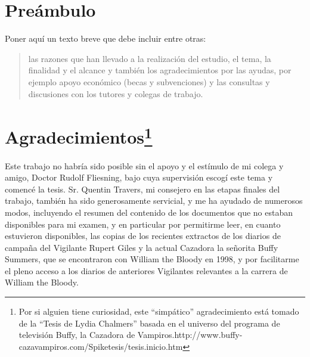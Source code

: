 

\chapter*{Preámbulo}
\thispagestyle{empty}
Poner aquí un texto breve que debe incluir entre otras:
\begin{quote}
	las razones que han llevado a la realización del estudio, el tema, la finalidad y el alcance y también los agradecimientos por las ayudas, por ejemplo apoyo económico (becas y subvenciones) y las consultas y discusiones con los tutores y colegas de trabajo. \citep{UNE50136:97}
\end{quote}


\cleardoublepage %

\chapter*{Agradecimientos\footnote{Por si alguien tiene curiosidad, este ``simpático'' agradecimiento está tomado de la ``Tesis de Lydia Chalmers'' basada en el universo del programa de televisión Buffy, la Cazadora de Vampiros.http://www.buffy-cazavampiros.com/Spiketesis/tesis.inicio.htm}
}

\thispagestyle{empty}
\vspace{1cm}

Este trabajo no habría sido posible sin el apoyo y el estímulo de mi colega y amigo, Doctor Rudolf Fliesning,  bajo cuya supervisión escogí este tema y comencé la tesis. Sr. Quentin Travers, mi consejero en las etapas finales del trabajo, también ha sido generosamente servicial, y me ha ayudado de numerosos modos, incluyendo el resumen del contenido de los documentos que no estaban disponibles para mi examen, y en particular por permitirme leer, en cuanto estuvieron  disponibles, las copias de los  recientes extractos de los diarios de campaña del Vigilante Rupert Giles y la actual Cazadora la señorita Buffy Summers, que se encontraron con William the Bloody en 1998, y por facilitarme el pleno acceso  a los diarios de anteriores Vigilantes relevantes a la carrera de William the Bloody.

